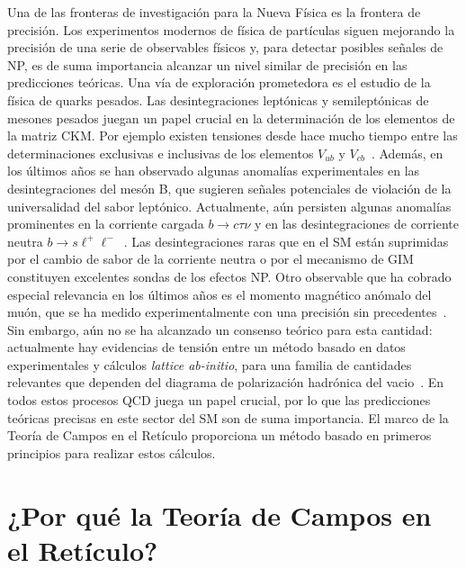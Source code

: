 Una de las fronteras de investigación para la Nueva Física es la frontera de precisión. Los experimentos modernos de física de partículas siguen mejorando la precisión de una serie de observables físicos y, para detectar posibles señales de NP, es de suma importancia alcanzar un nivel similar de precisión en las predicciones teóricas. Una vía de exploración prometedora es el estudio de la física de quarks pesados. Las desintegraciones leptónicas y semileptónicas de mesones pesados juegan un papel crucial en la determinación de los elementos de la matriz CKM.  Por ejemplo existen tensiones desde hace mucho tiempo entre las determinaciones exclusivas e inclusivas de los elementos $V_{ub}$ y $V_{cb}$~\citep{Ricciardi:2019zph}. Además, en los últimos años se han observado algunas anomalías experimentales en las desintegraciones del mesón B, que sugieren señales potenciales de violación de la universalidad del sabor leptónico. Actualmente, aún persisten algunas anomalías prominentes en la corriente cargada $b\to c\tau\nu$ y en las desintegraciones de corriente neutra $b\to s\ell^+\ell^-$~\citep{Capdevila:2023yhq}. Las desintegraciones raras que en el SM están suprimidas por el cambio de sabor de la corriente neutra o por el mecanismo de GIM constituyen excelentes sondas de los efectos NP. Otro observable que ha cobrado especial relevancia en los últimos años es el momento magnético anómalo del muón, que se ha medido experimentalmente con una precisión sin precedentes~\citep{Muong-2:2006rrc,PhysRevLett.131.161802}. Sin embargo, aún no se ha alcanzado un consenso teórico para esta cantidad: actualmente hay evidencias de tensión entre un método basado en datos experimentales y cálculos \textit{lattice ab-initio}, para una familia de cantidades relevantes que dependen del diagrama de polarización hadrónica del vacio~\citep{DellaMorte:2017dyu,Jegerlehner:2017lbd,RBC:2018dos,Giusti:2019xct,Benayoun:2019zwh,Keshavarzi:2019abf,FermilabLattice:2019ugu,Gerardin:2019rua,Borsanyi:2020mff,Ce:2022kxy,Kuberski:2024bcj,Boccaletti:2024guq}. En todos estos procesos QCD juega un papel crucial, por lo que las predicciones teóricas precisas en este sector del SM son de suma importancia. El marco de la Teoría de Campos en el Retículo proporciona un método basado en primeros principios para realizar estos cálculos.

\section*{¿Por qué la Teoría de Campos en el Retículo?}

